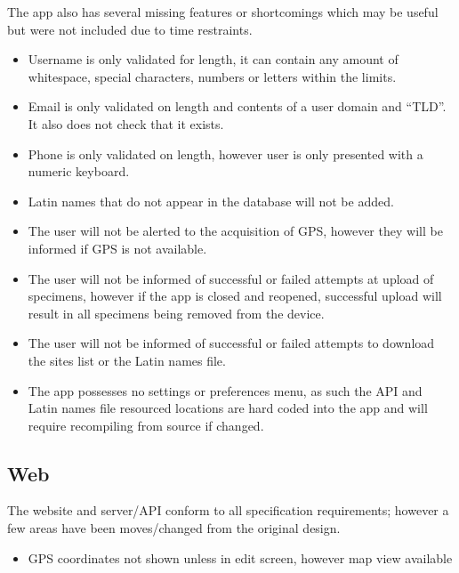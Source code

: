     The app also has several missing features or shortcomings which may be useful but were not included due to time restraints. 
    \begin{itemize}
        \item Username is only validated for length, it can contain any amount of whitespace, special characters, numbers or letters within the limits.
        \item Email is only validated on length and contents of a user domain and ``TLD''. It also does not check that it exists.
        \item Phone is only validated on length, however user is only presented with a numeric keyboard.
        \item Latin names that do not appear in the database will not be added.
        \item The user will not be alerted to the acquisition of GPS, however they will be informed if GPS is not available. 
        \item The user will not be informed of successful or failed attempts at upload of specimens, however if the app is closed and reopened, successful upload will result in all specimens being removed from the device. 
        \item The user will not be informed of successful or failed attempts to download the sites list or the Latin names file.
        \item The app possesses no settings or preferences menu, as such the API and Latin names file resourced locations are hard coded into the app and will require recompiling from source if changed.
    \end{itemize}

\subsection{Web}
    The website and server/API conform to all specification requirements; however a few areas have been moves/changed from the original design. 

    \begin{itemize}
        \item GPS coordinates not shown unless in edit screen, however map view available
    \end{itemize}

